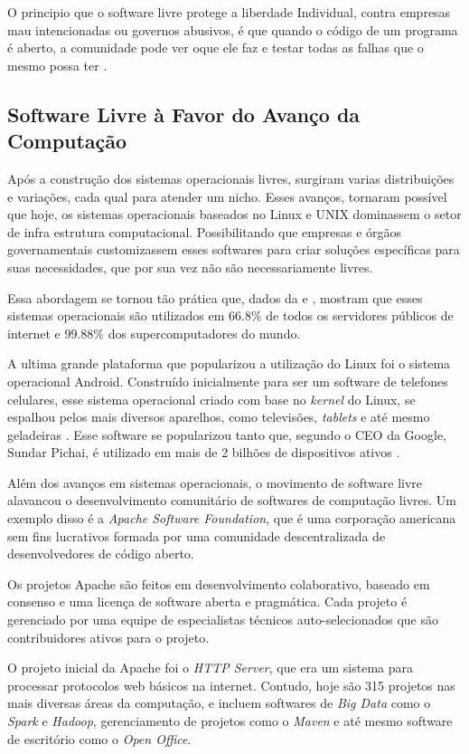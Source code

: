 O principio que o software livre protege a liberdade Individual, contra empresas mau intencionadas ou governos abusivos, é que quando o código de um programa é aberto, a comunidade pode ver oque ele faz e testar todas as falhas que o mesmo possa ter \cite{GNUOperatingSystem}.

\subsection{Software Livre à Favor do Avanço da Computação}
Após a construção dos sistemas operacionais livres, surgiram varias distribuições e variações, cada qual para atender um nicho. Esses avanços, tornaram possível que hoje, os sistemas operacionais baseados no Linux e UNIX dominassem o setor de infra estrutura computacional. Possibilitando que empresas e órgãos governamentais customizassem esses softwares para criar soluções específicas para suas necessidades, que por sua vez não são necessariamente livres.

Essa abordagem se tornou tão prática que, dados da  e , mostram que esses sistemas operacionais são utilizados em $66.8\%$ de todos os servidores públicos de internet e $99.88\%$ dos supercomputadores do mundo. 

A ultima grande plataforma que popularizou a utilização do Linux foi o sistema operacional Android.  Construído inicialmente para ser um software de telefones celulares, esse sistema operacional criado com base no \textit{kernel} do Linux, se espalhou pelos mais diversos aparelhos, como televisões, \textit{tablets} e até mesmo geladeiras \cite{Riley2012}. Esse software se popularizou tanto que, segundo o CEO da Google, Sundar Pichai, é utilizado em mais de 2 bilhões de dispositivos ativos \cite{Riley2012}.

Além dos avanços em sistemas operacionais, o movimento de software livre alavancou o desenvolvimento comunitário de softwares de computação livres. Um exemplo disso é a \textit{Apache Software Foundation}, que é uma corporação americana sem fins lucrativos formada por uma comunidade descentralizada de desenvolvedores de código aberto. 

Os projetos Apache são feitos em desenvolvimento colaborativo, baseado em consenso e uma licença de software aberta e pragmática. Cada projeto é gerenciado por uma equipe de especialistas técnicos auto-selecionados que são contribuidores ativos para o projeto. 

O projeto inicial da Apache foi o \textit{HTTP Server}, que era um sistema para processar protocolos web básicos na internet. Contudo, hoje são 315 projetos nas mais diversas áreas da computação, e incluem softwares de \textit{Big Data} como o \textit{Spark} e \textit{Hadoop}, gerenciamento de projetos como o \textit{Maven} e até mesmo software de escritório como o \textit{Open Office}.


